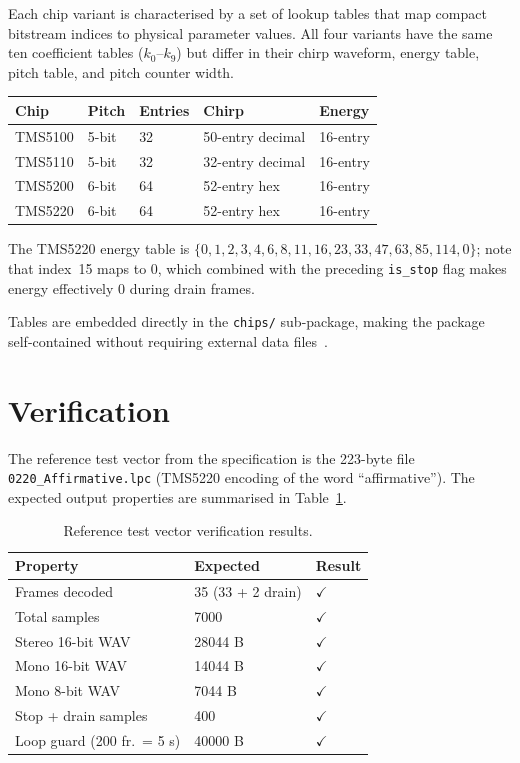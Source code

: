 \documentclass[10pt]{article}
\begin{document}
Each chip variant is characterised by a set of lookup tables that map compact
bitstream indices to physical parameter values.  All four variants have the
same ten coefficient tables ($k_0$--$k_9$) but differ in their chirp waveform,
energy table, pitch table, and pitch counter width.

\begin{center}
\begin{tabular}{lllll}
\toprule
Chip    & Pitch & Entries & Chirp & Energy \\
\midrule
TMS5100 & 5-bit & 32 & 50-entry decimal & 16-entry \\
TMS5110 & 5-bit & 32 & 32-entry decimal & 16-entry \\
TMS5200 & 6-bit & 64 & 52-entry hex     & 16-entry \\
TMS5220 & 6-bit & 64 & 52-entry hex     & 16-entry \\
\bottomrule
\end{tabular}
\end{center}

The TMS5220 energy table is
$\{0, 1, 2, 3, 4, 6, 8, 11, 16, 23, 33, 47, 63, 85, 114, 0\}$; note that
index~15 maps to 0, which combined with the preceding \texttt{is\_stop} flag
makes energy effectively 0 during drain frames.

Tables are embedded directly in the \texttt{chips/} sub-package, making the
package self-contained without requiring external data files~\cite{TMS5220_1983,TMS5100_1981}.

\section{Verification}
\label{sec:verify}

The reference test vector from the specification is the 223-byte file
\texttt{0220\_Affirmative.lpc} (TMS5220 encoding of the word ``affirmative'').
The expected output properties are summarised in Table~\ref{tab:verify}.

\begin{table}[H]
\centering
\caption{Reference test vector verification results.}
\label{tab:verify}
\begin{tabular}{lll}
\toprule
Property             & Expected & Result  \\
\midrule
Frames decoded       & 35 (33 + 2 drain) & $\checkmark$\\
Total samples        & 7000    & $\checkmark$\\
Stereo 16-bit WAV    & 28044 B & $\checkmark$\\
Mono 16-bit WAV      & 14044 B & $\checkmark$\\
Mono 8-bit WAV       & 7044 B  & $\checkmark$\\
Stop + drain samples & 400     & $\checkmark$\\
Loop guard (200 fr.\ = 5 s) & 40000 B & $\checkmark$\\
\bottomrule
\end{tabular}
\end{table}
\end{document}

